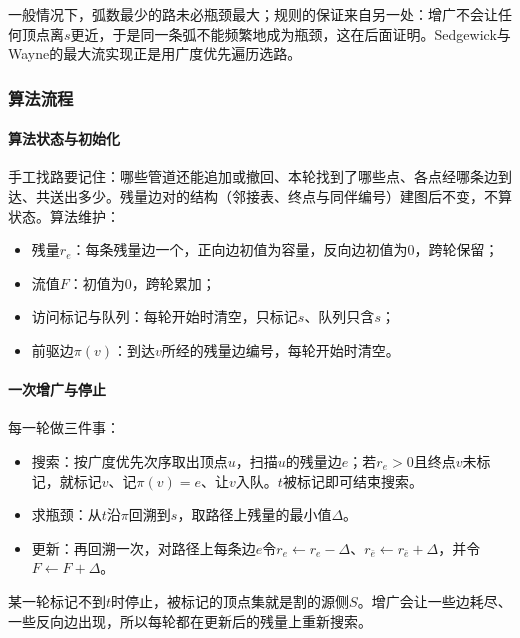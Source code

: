 一般情况下，弧数最少的路未必瓶颈最大；规则的保证来自另一处：增广不会让任何顶点离$s$更近，于是同一条弧不能频繁地成为瓶颈，这在后面证明。Sedgewick与Wayne的最大流实现正是用广度优先遍历选路。

\subsubsection{算法流程}

\paragraph{算法状态与初始化}
手工找路要记住：哪些管道还能追加或撤回、本轮找到了哪些点、各点经哪条边到达、共送出多少。残量边对的结构（邻接表、终点与同伴编号）建图后不变，不算状态。算法维护：
\begin{itemize}
  \item 残量$r_e$：每条残量边一个，正向边初值为容量，反向边初值为$0$，跨轮保留；
  \item 流值$F$：初值为$0$，跨轮累加；
  \item 访问标记与队列：每轮开始时清空，只标记$s$、队列只含$s$；
  \item 前驱边$\pi(v)$：到达$v$所经的残量边编号，每轮开始时清空。
\end{itemize}

\paragraph{一次增广与停止}
每一轮做三件事：
\begin{itemize}
  \item 搜索：按广度优先次序取出顶点$u$，扫描$u$的残量边$e$；若$r_e>0$且终点$v$未标记，就标记$v$、记$\pi(v)=e$、让$v$入队。$t$被标记即可结束搜索。
  \item 求瓶颈：从$t$沿$\pi$回溯到$s$，取路径上残量的最小值$\Delta$。
  \item 更新：再回溯一次，对路径上每条边$e$令$r_e\gets r_e-\Delta$、$r_{\bar e}\gets r_{\bar e}+\Delta$，并令$F\gets F+\Delta$。
\end{itemize}
某一轮标记不到$t$时停止，被标记的顶点集就是割的源侧$S$。增广会让一些边耗尽、一些反向边出现，所以每轮都在更新后的残量上重新搜索。

